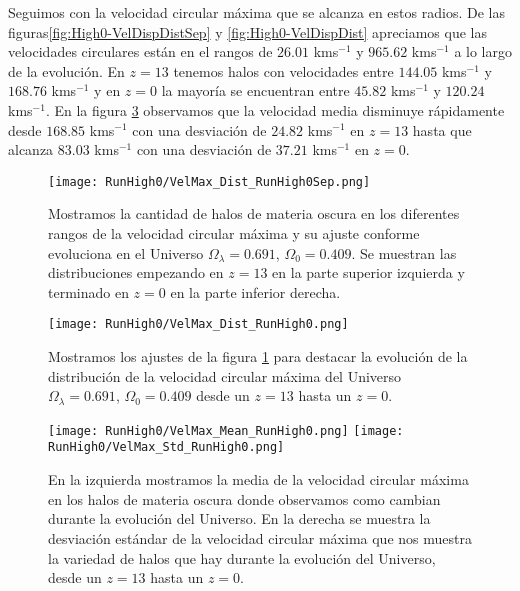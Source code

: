 Seguimos con la velocidad circular máxima que se alcanza en estos radios. De las figuras\ref{fig:High0-VelDispDistSep} y \ref{fig:High0-VelDispDist} apreciamos que las velocidades circulares están en el rangos de $26.01$ kms$^{-1}$ y $965.62$ kms$^{-1}$ a lo largo de la evolución. En $z=13$ tenemos halos con velocidades entre $144.05$ kms$^{-1}$ y $168.76$ kms$^{-1}$ y en $z=0$ la mayoría se encuentran entre $45.82$ kms$^{-1}$ y $120.24$ kms$^{-1}$. En la figura \ref{fig:High0-VelMaxStats} observamos que la velocidad media disminuye rápidamente desde $168.85$ kms$^{-1}$ con una desviación de $24.82$ kms$^{-1}$ en $z=13$ hasta que alcanza $83.03$ kms$^{-1}$ con una desviación de $37.21$ kms$^{-1}$ en $z=0$.

\begin{figure}[H]
    \centering
    \texttt{[image: RunHigh0/VelMax\_Dist\_RunHigh0Sep.png]}
    \caption[Velocidad circular máxima]{\footnotesize Mostramos la cantidad de halos de materia oscura en los diferentes rangos de la velocidad circular máxima y su ajuste conforme evoluciona en el Universo $\Omega_\lambda = 0.691$, $\Omega_0 = 0.409$. Se muestran las distribuciones empezando en $z=13$ en la parte superior izquierda y terminado en $z=0$ en la parte inferior derecha.}
    \label{fig:High0-VelMaxDistSep}
\end{figure}

\begin{figure}[H]
    \centering
    \texttt{[image: RunHigh0/VelMax\_Dist\_RunHigh0.png]}
    \caption[Distribución de la velocidad circular máxima]{\footnotesize Mostramos los ajustes de la figura \ref{fig:High0-VelMaxDistSep} para destacar la evolución de la distribución de la velocidad circular máxima del Universo $\Omega_\lambda = 0.691$, $\Omega_0 = 0.409$ desde un $z=13$ hasta un $z=0$.}
    \label{fig:High0-VelMaxDist}
\end{figure}

\begin{figure}[H]
    \centering
    \texttt{[image: RunHigh0/VelMax\_Mean\_RunHigh0.png]}
    \texttt{[image: RunHigh0/VelMax\_Std\_RunHigh0.png]}
    \caption[Media y desviación estándar de la velocidad circular máxima]{\footnotesize En la izquierda mostramos la media de la velocidad circular máxima en los halos de materia oscura donde observamos como cambian durante la evolución del Universo. En la derecha se muestra la desviación estándar de la velocidad circular máxima que nos muestra la variedad de halos que hay durante la evolución del Universo, desde un $z=13$ hasta un $z=0$.}
    \label{fig:High0-VelMaxStats}
\end{figure}

